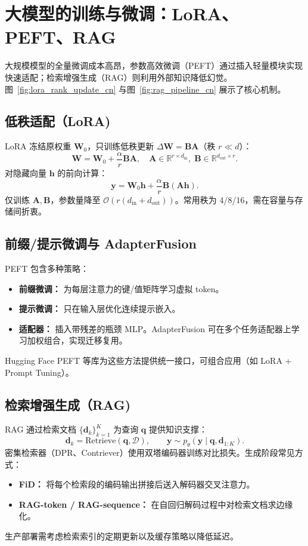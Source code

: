 \documentclass[UTF8,zihao=-4]{ctexart}
\begin{document}
\section{大模型的训练与微调：LoRA、PEFT、RAG}
大规模模型的全量微调成本高昂，参数高效微调（PEFT）通过插入轻量模块实现快速适配；检索增强生成（RAG）则利用外部知识降低幻觉。图~\ref{fig:lora_rank_update_cn} 与图~\ref{fig:rag_pipeline_cn} 展示了核心机制。

\subsection{低秩适配（LoRA)}
LoRA 冻结原权重 $\mathbf{W}_0$，只训练低秩更新 $\Delta \mathbf{W} = \mathbf{B} \mathbf{A}$（秩 $r \ll d$）：
\begin{equation}
  \mathbf{W} = \mathbf{W}_0 + \frac{\alpha}{r} \mathbf{B} \mathbf{A}, \quad \mathbf{A} \in \mathbb{R}^{r \times d_{\text{in}}}, \; \mathbf{B} \in \mathbb{R}^{d_{\text{out}} \times r}.
\end{equation}
对隐藏向量 $\mathbf{h}$ 的前向计算：
\begin{equation}
  \mathbf{y} = \mathbf{W}_0 \mathbf{h} + \frac{\alpha}{r} \mathbf{B} (\mathbf{A} \mathbf{h}).
\end{equation}
仅训练 $\mathbf{A}, \mathbf{B}$，参数量降至 $\mathcal{O}(r(d_{\text{in}} + d_{\text{out}}))$。常用秩为 4/8/16，需在容量与存储间折衷。

\subsection{前缀/提示微调与 AdapterFusion}
PEFT 包含多种策略：
\begin{itemize}
  \item \textbf{前缀微调：} 为每层注意力的键/值矩阵学习虚拟 token。
  \item \textbf{提示微调：} 只在输入层优化连续提示嵌入。
  \item \textbf{适配器：} 插入带残差的瓶颈 MLP。AdapterFusion 可在多个任务适配器上学习加权组合，实现迁移复用。
\end{itemize}
Hugging Face PEFT 等库为这些方法提供统一接口，可组合应用（如 LoRA + Prompt Tuning）。

\subsection{检索增强生成（RAG)}
RAG 通过检索文档 $\{\mathbf{d}_k\}_{k=1}^{K}$ 为查询 $\mathbf{q}$ 提供知识支撑：
\begin{equation}
  \mathbf{d}_k = \mathrm{Retrieve}(\mathbf{q}, \mathcal{D}), \qquad \mathbf{y} \sim p_{\theta}(\mathbf{y} \mid \mathbf{q}, \mathbf{d}_{1:K}).
\end{equation}
密集检索器（DPR、Contriever）使用双塔编码器训练对比损失。生成阶段常见方式：
\begin{itemize}
  \item \textbf{FiD：} 将每个检索段的编码输出拼接后送入解码器交叉注意力。
  \item \textbf{RAG-token / RAG-sequence：} 在自回归解码过程中对检索文档求边缘化。
\end{itemize}
生产部署需考虑检索索引的定期更新以及缓存策略以降低延迟。
\end{document}
